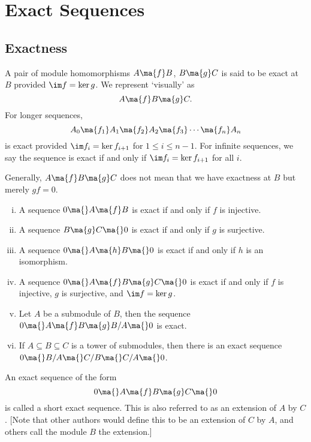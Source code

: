 \section{Exact Sequences}
\subsection{Exactness}


\begin{dfn}[Exactness]
A pair of module homomorphisms $A\ma{f} B$, $B \ma{g} C$ is said to be exact at $B$ provided $\im f = \ker g$. We represent `visually' as
	\[
	A \ma{f} B \ma{g} C.
	\]
For longer sequences, 
	\[
	A_0 \ma{f_1} A_1 \ma{f_2} A_2 \ma{f_3} \cdots \ma{f_n} A_n
	\]
is exact provided $\im f_i=\ker f_{i+1}$ for $1 \leq i \leq n-1$. For infinite sequences, we say the sequence is exact if and only if $\im f_i=\ker f_{i+1}$ for all $i$. 
\end{dfn}


\begin{rem}
Generally, $A \ma{f} B \ma{g} C$ does not mean that we have exactness at $B$ but merely $gf=0$.
\end{rem}


\begin{ex} \label{ex:simple_exact} \hfill
\begin{enumerate}[(i)]
\item A sequence $0 \ma{} A \ma{f} B$ is exact if and only if $f$ is injective.
\item A sequence $B \ma{g} C \ma{} 0$ is exact if and only if $g$ is surjective.
\item A sequence $0 \ma{} A \ma{h} B \ma{} 0$ is exact if and only if $h$ is an isomorphism.
\item A sequence $0 \ma{} A \ma{f} B \ma{g} C \ma{} 0$ is exact if and only if $f$ is injective, $g$ is surjective, and $\im f=\ker g$. 
\item Let $A$ be a submodule of $B$, then the sequence $0 \ma{} A \ma{f} B \ma{g} B/A \ma{} 0$ is exact. 
\item If $A \subseteq B \subseteq C$ is a tower of submodules, then there is an exact sequence $0 \ma{} B/A \ma{} C/B \ma{} C/A \ma{} 0$. 
\end{enumerate} \xqed
\end{ex}


\begin{dfn}
An exact sequence of the form 
	\[
	0 \ma{} A \ma{f} B \ma{g} C \ma{} 0
	\]
is called a short exact sequence. This is also referred to as an extension of $A$ by $C$. [Note that other authors would define this to be an extension of $C$ by $A$, and others call the module $B$ the extension.] 
\end{dfn}


